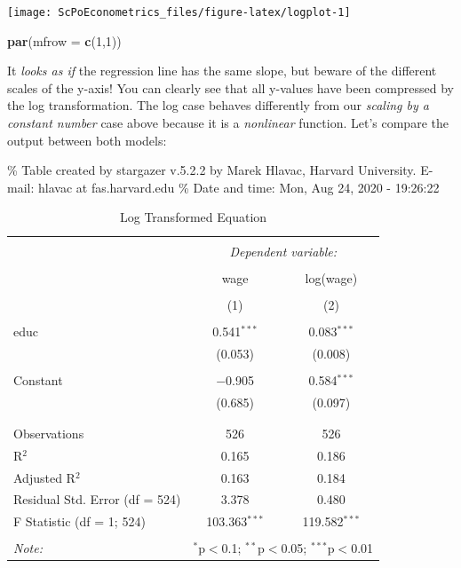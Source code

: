 \documentclass[]{book}
\newenvironment{Shaded}{\begin{snugshade}}{\end{snugshade}}
\newcommand{\DataTypeTok}[1]{\textcolor[rgb]{0.13,0.29,0.53}{#1}}
\newcommand{\DecValTok}[1]{\textcolor[rgb]{0.00,0.00,0.81}{#1}}
\newcommand{\KeywordTok}[1]{\textcolor[rgb]{0.13,0.29,0.53}{\textbf{#1}}}
\newcommand{\NormalTok}[1]{#1}
\begin{document}
\begin{center}\texttt{[image: ScPoEconometrics\_files/figure-latex/logplot-1]} \end{center}

\begin{Shaded}
\begin{Highlighting}[]
\KeywordTok{par}\NormalTok{(}\DataTypeTok{mfrow =} \KeywordTok{c}\NormalTok{(}\DecValTok{1}\NormalTok{,}\DecValTok{1}\NormalTok{))}
\end{Highlighting}
\end{Shaded}

It \emph{looks as if} the regression line has the same slope, but beware of the different scales of the y-axis! You can clearly see that all y-values have been compressed by the log transformation. The log case behaves differently from our \emph{scaling by a constant number} case above because it is a \emph{nonlinear} function. Let's compare the output between both models:

\% Table created by stargazer v.5.2.2 by Marek Hlavac, Harvard University. E-mail: hlavac at fas.harvard.edu
\% Date and time: Mon, Aug 24, 2020 - 19:26:22

\begin{table}[!htbp] \centering 
  \caption{Log Transformed Equation} 
  \label{} 
\begin{tabular}{@{\extracolsep{5pt}}lcc} 
\\[-1.8ex]\hline 
\hline \\[-1.8ex] 
 & \multicolumn{2}{c}{\textit{Dependent variable:}} \\ 
\cline{2-3} 
\\[-1.8ex] & wage & log(wage) \\ 
\\[-1.8ex] & (1) & (2)\\ 
\hline \\[-1.8ex] 
 educ & 0.541$^{***}$ & 0.083$^{***}$ \\ 
  & (0.053) & (0.008) \\ 
  & & \\ 
 Constant & $-$0.905 & 0.584$^{***}$ \\ 
  & (0.685) & (0.097) \\ 
  & & \\ 
\hline \\[-1.8ex] 
Observations & 526 & 526 \\ 
R$^{2}$ & 0.165 & 0.186 \\ 
Adjusted R$^{2}$ & 0.163 & 0.184 \\ 
Residual Std. Error (df = 524) & 3.378 & 0.480 \\ 
F Statistic (df = 1; 524) & 103.363$^{***}$ & 119.582$^{***}$ \\ 
\hline 
\hline \\[-1.8ex] 
\textit{Note:}  & \multicolumn{2}{r}{$^{*}$p$<$0.1; $^{**}$p$<$0.05; $^{***}$p$<$0.01} \\ 
\end{tabular} 
\end{table}
\end{document}

